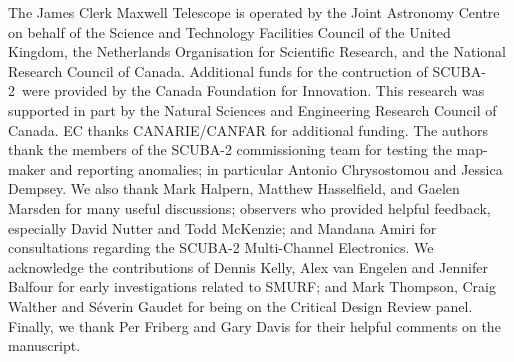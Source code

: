 \documentclass[useAMS,usenatbib,nofootinbib]{mn2e}
\newcommand{\scuba}{SCUBA-2}
\begin{document}
The James Clerk Maxwell Telescope is operated by the Joint Astronomy
Centre on behalf of the Science and Technology Facilities Council of
the United Kingdom, the Netherlands Organisation for Scientific
Research, and the National Research Council of Canada. Additional
funds for the contruction of \scuba\ were provided by the Canada
Foundation for Innovation.  This research was supported in part by the
Natural Sciences and Engineering Research Council of Canada.  EC
thanks CANARIE/CANFAR for additional funding.  The authors thank the
members of the SCUBA-2 commissioning team for testing the map-maker
and reporting anomalies; in particular Antonio Chrysostomou and
Jessica Dempsey.  We also thank Mark Halpern, Matthew Hasselfield, and
Gaelen Marsden for many useful discussions; observers who provided
helpful feedback, especially David Nutter and Todd McKenzie; and
Mandana Amiri for consultations regarding the SCUBA-2 Multi-Channel
Electronics.  We acknowledge the contributions of Dennis Kelly, Alex
van Engelen and Jennifer Balfour for early investigations related to
SMURF; and Mark Thompson, Craig Walther and S\'{e}verin Gaudet for
being on the Critical Design Review panel. Finally, we thank Per
Friberg and Gary Davis for their helpful comments on the manuscript.




\end{document}
